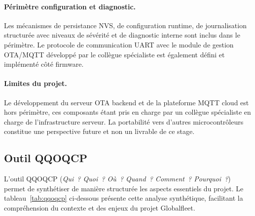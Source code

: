 \paragraph{Périmètre configuration et diagnostic.}
Les mécanismes de persistance NVS, de configuration runtime, de
journalisation structurée avec niveaux de sévérité et de diagnostic
interne sont inclus dans le périmètre. Le protocole de communication
UART avec le module de gestion OTA/MQTT développé par le collègue
spécialiste est également défini et implémenté côté firmware.

\paragraph{Limites du projet.}
Le développement du serveur OTA backend et de la plateforme MQTT
cloud est hors périmètre, ces composants étant pris en charge par
un collègue spécialiste en charge de l'infrastructure serveur. La
portabilité vers d'autres microcontrôleurs constitue une perspective
future et non un livrable de ce stage.

\subsection{Outil QQOQCP}
\label{subsec:qqoqcp}

L'outil QQOQCP (\textit{Qui~? Quoi~? Où~? Quand~? Comment~?
Pourquoi~?}) permet de synthétiser de manière structurée les aspects
essentiels du projet. Le tableau~\ref{tab:qqoqcp} ci-dessous présente
cette analyse synthétique, facilitant la compréhension du contexte
et des enjeux du projet Globalfleet.

